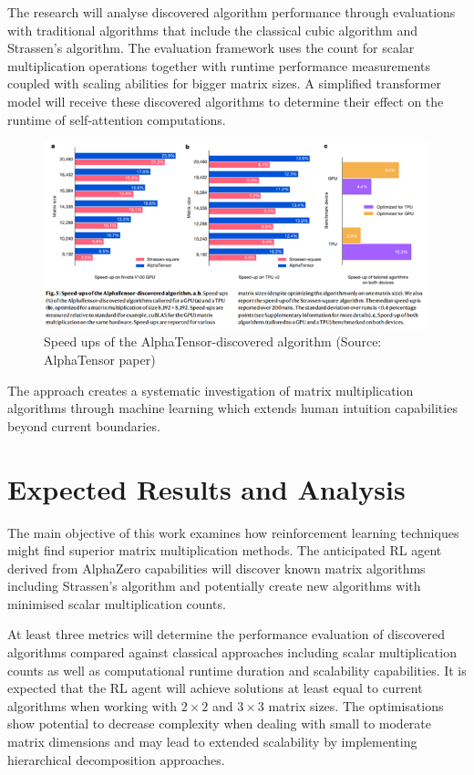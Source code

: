 \documentclass{article}
\begin{document}
The research will analyse discovered algorithm performance through evaluations with traditional algorithms that include the classical cubic algorithm and Strassen's algorithm. The evaluation framework uses the count for scalar multiplication operations together with runtime performance measurements coupled with scaling abilities for bigger matrix sizes. A simplified transformer model will receive these discovered algorithms to determine their effect on the runtime of self-attention computations.

\begin{figure}[H]
    \centering
    \includegraphics[width=0.6\linewidth]{Picture3.png}
    \caption{Speed ups of the AlphaTensor-discovered algorithm (Source: AlphaTensor paper)}
    \label{fig:speedups-alphatensor}
\end{figure}

The approach creates a systematic investigation of matrix multiplication algorithms through machine learning which extends human intuition capabilities beyond current boundaries.

\section{Expected Results and Analysis}
The main objective of this work examines how reinforcement learning techniques might find superior matrix multiplication methods. The anticipated RL agent derived from AlphaZero capabilities will discover known matrix algorithms including Strassen's algorithm and potentially create new algorithms with minimised scalar multiplication counts.

At least three metrics will determine the performance evaluation of discovered algorithms compared against classical approaches including scalar multiplication counts as well as computational runtime duration and scalability capabilities. It is expected that the RL agent will achieve solutions at least equal to current algorithms when working with \( 2 \times 2 \) and \( 3 \times 3 \) matrix sizes. The optimisations show potential to decrease complexity when dealing with small to moderate matrix dimensions and may lead to extended scalability by implementing hierarchical decomposition approaches.
\end{document}
